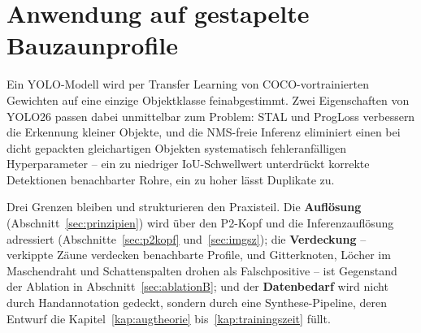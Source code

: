 \section{Anwendung auf gestapelte Bauzaunprofile}
\label{sec:anwendung}

Ein YOLO-Modell wird per Transfer Learning von COCO-vortrainierten Gewichten
\parencite{yosinski2014} auf eine einzige Objektklasse feinabgestimmt. Zwei
Eigenschaften von YOLO26 passen dabei unmittelbar zum Problem: STAL und ProgLoss
verbessern die Erkennung kleiner Objekte, und die NMS-freie Inferenz eliminiert
einen bei dicht gepackten gleichartigen Objekten systematisch fehleranfälligen
Hyperparameter -- ein zu niedriger IoU-Schwellwert unterdrückt korrekte
Detektionen benachbarter Rohre, ein zu hoher lässt Duplikate zu.

Drei Grenzen bleiben und strukturieren den Praxisteil. Die \textbf{Auflösung}
(Abschnitt~\ref{sec:prinzipien}) wird über den P2-Kopf und die Inferenzauflösung
adressiert (Abschnitte~\ref{sec:p2kopf} und~\ref{sec:imgsz}); die
\textbf{Verdeckung} -- verkippte Zäune verdecken benachbarte Profile, und
Gitterknoten, Löcher im Maschendraht und Schattenspalten drohen als
Falschpositive -- ist Gegenstand der Ablation in Abschnitt~\ref{sec:ablationB};
und der \textbf{Datenbedarf} wird nicht durch Handannotation gedeckt, sondern
durch eine Synthese-Pipeline, deren Entwurf die Kapitel~\ref{kap:augtheorie}
bis~\ref{kap:trainingszeit} füllt.
